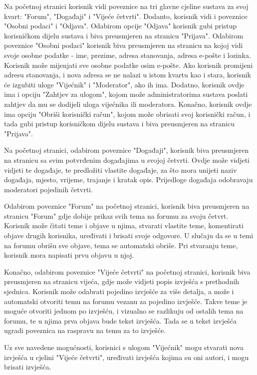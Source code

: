	Na početnoj stranici korisnik vidi poveznice na tri glavne cjeline sustava za svoj kvart: "Forum", "Događaji" i "Vijeće četvrti". Dodanto, korisnik vidi i poveznice "Osobni podaci" i "Odjava". Odabirom opcije "Odjava" korisnik gubi pristup korisničkom dijelu sustava i biva preusmjeren na stranicu "Prijava". Odabirom poveznice "Osobni podaci" korisnik biva preusmjeren na stranicu na kojoj vidi svoje osobne podatke - ime, prezime, adresa stanovanja, adresa e-pošte i lozinka. Korisnik može mijenjati sve osobne podatke osim e-pošte. Ako korisnik promijeni adresu stanovanja, i nova adresa se ne nalazi u istom kvartu kao i stara, korisnik će izgubiti uloge "Vijećnik" i "Moderator", ako ih ima. Dodatno, korisnik ovdje ima i opciju "Zahtjev za ulogom", kojom može administratorima sustava poslati zahtjev da mu se dodijeli uloga vijećnika ili moderatora. Konačno, korisnik ovdje ima opciju "Obriši korisnički račun", kojom može obrisati svoj korisnički račun, i tada gubi pristup korisničkom dijelu sustava i biva preusmjeren na stranicu "Prijava". 
	
	Na početnoj stranici, odabirom poveznice "Događaji", korisnik biva preusmjeren na stranicu sa svim potvrđenim događajima u svojoj četvrti. Ovdje može vidjeti vidjeti te događaje, te predložiti vlastite događaje, za što mora unijeti naziv događaja, mjesto, vrijeme, trajanje i kratak opis. Prijedloge događaja odobravaju moderatori pojedinih četvrti.
	
	Odabirom poveznice "Forum" na početnoj stranici, korisnik biva preusmjeren na stranicu "Forum" gdje dobije prikaz svih tema na forumu za svoju četvrt. Korisnik može čitati teme i objave u njima, stvarati vlastite teme, komentirati objave drugih korisnika, uređivati i brisati svoje odgovore. U slučaju da se u temi na forumu obrišu sve objave, tema se automatski obriše. Pri stvaranju teme, korisnik mora napisati prvu objavu u njoj.
	
	Konačno, odabirom poveznice "Vijeće četvrti" na početnoj stranici, korisnik biva preusmjeren na stranicu vijeća, gdje može vidjeti popis izvješća s prethodnih sjednica. Korisnik može odabrati pojedino izvješće za više detalja, a može i automatski otvoriti temu na forumu vezanu za pojedino izvješće. Takve teme je moguće otvoriti jednom po izvješću, i vizualno se razlikuju od ostalih tema na forumu, te u njima prva objava bude tekst izvješća. Tada se u tekst izvješća ugradi poveznica na raspravu na temu za to izvješće.
	
	Uz sve navedene mogućnosti, korisnici s ulogom "Vijećnik" mogu stvarati nova izvješća u cjelini "Vijeće četvrti", uređivati izvješća kojima su oni autori, i mogu brisati izvješća.
	
